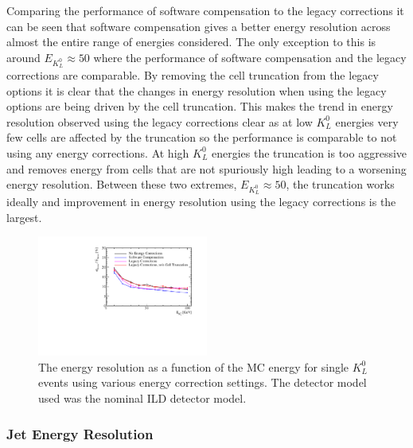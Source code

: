 Comparing the performance of software compensation to the legacy corrections it can be seen that software compensation gives a better energy resolution across almost the entire range of energies considered.  The only exception to this is around $E_{K^{0}_{L}} \approx 50$ where the performance of software compensation and the legacy corrections are comparable.  By removing the cell truncation from the legacy options it is clear that the changes in energy resolution when using the legacy options are being driven by the cell truncation.  This makes the trend in energy resolution observed using the legacy corrections clear as at low $K^{0}_{L}$ energies very few cells are affected by the truncation so the performance is comparable to not using any energy corrections.  At high $K^{0}_{L}$ energies the truncation is too aggressive and removes energy from cells that are not spuriously high leading to a worsening energy resolution.  Between these two extremes, $E_{K^{0}_{L}} \approx 50$, the truncation works ideally and improvement in energy resolution using the legacy corrections is the largest.  

\begin{figure}
\includegraphics[width=0.5\textwidth]{EnergyEstimators/Plots/SoftComp/EnergyResolution/ER_vs_Kaon0LSoftComp_Kaon0L.pdf}
\caption[The energy resolution as a function of the MC energy for single $K^{0}_{L}$ events using various energy correction settings.  The detector model used was the nominal ILD detector model.]{The energy resolution as a function of the MC energy for single $K^{0}_{L}$ events using various energy correction settings.  The detector model used was the nominal ILD detector model.}
\label{fig:ersoftcomp}
\end{figure}


\subsubsection{Jet Energy Resolution}


